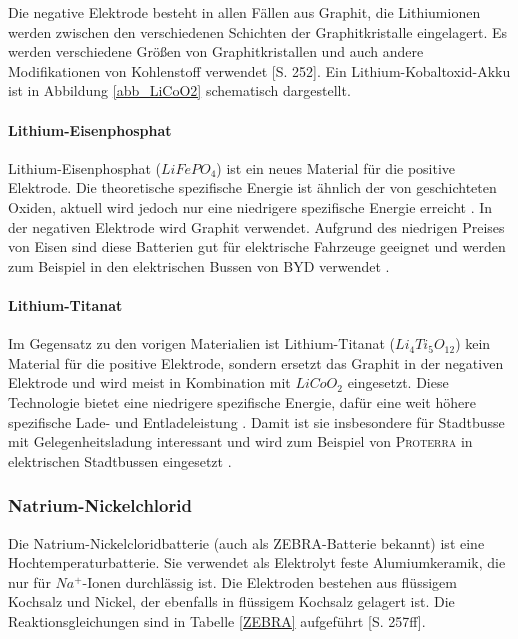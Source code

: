 Die negative Elektrode besteht in allen Fällen aus Graphit, die Lithiumionen werden zwischen den verschiedenen Schichten der Graphitkristalle eingelagert. Es werden verschiedene Größen von Graphitkristallen und auch andere Modifikationen von Kohlenstoff verwendet \cite{Sterner:2014}[S. 252]. Ein Lithium-Kobaltoxid-Akku ist in Abbildung \ref{abb_LiCoO2} schematisch dargestellt.

\paragraph{Lithium-Eisenphosphat}
Lithium-Eisenphosphat ($LiFePO_4$) ist ein neues Material für die positive Elektrode. Die theoretische spezifische Energie ist ähnlich der von geschichteten Oxiden, aktuell wird jedoch nur eine niedrigere spezifische Energie erreicht \cite{Tie201382}. In der negativen Elektrode wird Graphit verwendet. Aufgrund des niedrigen Preises von Eisen sind diese Batterien gut für elektrische Fahrzeuge geeignet und werden zum Beispiel in den elektrischen Bussen von \textsc{BYD} verwendet \cite{bydSpecs}.

\paragraph{Lithium-Titanat}
Im Gegensatz zu den vorigen Materialien ist Lithium-Titanat ($Li_4Ti_5O_{12}$) kein Material für die positive Elektrode, sondern ersetzt das Graphit in der negativen Elektrode und wird meist in Kombination mit $LiCoO_2$ eingesetzt. Diese Technologie bietet eine niedrigere spezifische Energie, dafür eine weit höhere spezifische Lade- und Entladeleistung \cite{veneri2012charging}. Damit ist sie insbesondere für Stadtbusse mit Gelegenheitsladung interessant und wird zum Beispiel von \textsc{Proterra} in elektrischen Stadtbussen eingesetzt \cite{protCat}.

\subsubsection{Natrium-Nickelchlorid}
Die Natrium-Nickelcloridbatterie (auch als ZEBRA-Batterie bekannt) ist eine Hochtemperaturbatterie. Sie verwendet als Elektrolyt feste Alumiumkeramik, die nur für $Na^+$-Ionen durchlässig ist. Die Elektroden bestehen aus flüssigem Kochsalz und Nickel, der ebenfalls in flüssigem Kochsalz gelagert ist. Die Reaktionsgleichungen sind in Tabelle \ref{ZEBRA} aufgeführt \cite{KiehneBattery}[S. 257ff].


